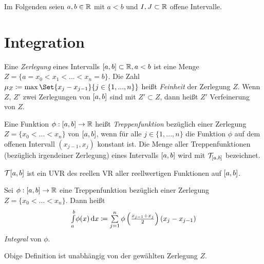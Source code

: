 \documentclass{cheat-sheet}
\begin{document}

\begin{nota}
Im Folgenden seien $a, b \in \mathbb{R}$ mit $a < b$ und $I, J \subset \mathbb{R}$ offene Intervalle.
\end{nota}

\section{Integration}

\begin{defn}
Eine \emph{Zerlegung} eines Intervalls $\left[ a, b \right] \subset \mathbb{R}, a < b$ ist eine Menge $Z = \{ a = x_{0} < x_{1} < ... < x_{n} = b \}$. Die Zahl $\mu_{Z} \coloneqq \max\Set{x_{j} - x_{j-1}}{j \in \{1, ..., n\}}$ heißt \emph{Feinheit} der Zerlegung $Z$. Wenn $Z$, $Z'$ zwei Zerlegungen von $\left[ a, b \right]$ sind mit $Z' \subset Z$, dann heißt $Z'$ Verfeinerung von $Z$.
\end{defn}

\begin{defn}
Eine Funktion $\phi : \left[ a, b \right] \to \mathbb{R}$ heißt \emph{Treppenfunktion} bezüglich einer Zerlegung $Z = \{ x_{0} < ... < x_{n} \}$ von $\left[ a, b \right]$, wenn für alle $j \in \{ 1, ..., n \}$ die Funktion $\phi$ auf dem offenen Intervall $(x_{j-1}, x_{j})$ konstant ist. Die Menge aller Treppenfunktionen (bezüglich irgendeiner Zerlegung) eines Intervalls $\left[ a, b \right]$ wird mit $\mathcal{T}_{\left[ a, b \right]}$ bezeichnet.
\end{defn}

\begin{satz}
$\mathcal{T}{\left[ a, b \right]}$ ist ein UVR des reellen VR aller reellwertigen Funktionen auf $\left[ a, b \right]$.
\end{satz}

\begin{defn}
Sei $\phi : \left[ a, b \right] \to \mathbb{R}$ eine Treppenfunktion bezüglich einer Zerlegung $Z = \{ x_0 < ... < x_n \}$. Dann heißt
\[ \Intabdx{\phi(x)} \coloneqq \sum_{j = 1}^{n} \phi\left(\tfrac{x_{j-1} + x_j}{2}\right)(x_j - x_{j-1}) \]
\emph{Integral} von $\phi$.
\end{defn}

\begin{bem}
Obige Definition ist unabhängig von der gewählten Zerlegung $Z$.
\end{bem}
\end{document}
